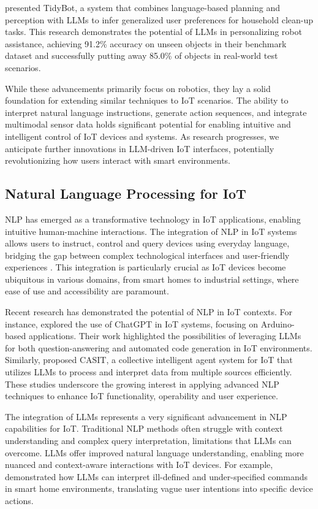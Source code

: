 \documentclass[lettersize,journal]{IEEEtran}
\begin{document}
\citet{Wu2023} presented TidyBot, a system that combines language-based planning and perception with LLMs to infer generalized user preferences for household clean-up tasks. This research demonstrates the potential of LLMs in personalizing robot assistance, achieving 91.2\% accuracy on unseen objects in their benchmark dataset and successfully putting away 85.0\% of objects in real-world test scenarios.

While these advancements primarily focus on robotics, they lay a solid foundation for extending similar techniques to IoT scenarios. The ability to interpret natural language instructions, generate action sequences, and integrate multimodal sensor data holds significant potential for enabling intuitive and intelligent control of IoT devices and systems. As research progresses, we anticipate further innovations in LLM-driven IoT interfaces, potentially revolutionizing how users interact with smart environments.

\subsection{Natural Language Processing for IoT}
NLP has emerged as a transformative technology in IoT applications, enabling intuitive human-machine interactions. The integration of NLP in IoT systems allows users to instruct, control and query devices using everyday language, bridging the gap between complex technological interfaces and user-friendly experiences \cite{10.1145/3643505}. This integration is particularly crucial as IoT devices become ubiquitous in various domains, from smart homes to industrial settings, where ease of use and accessibility are paramount.

Recent research has demonstrated the potential of NLP in IoT contexts. For instance, \citet{10315791} explored the use of ChatGPT in IoT systems, focusing on Arduino-based applications. Their work highlighted the possibilities of leveraging LLMs for both question-answering and automated code generation in IoT environments. Similarly, \citet{10439991} proposed CASIT, a collective intelligent agent system for IoT that utilizes LLMs to process and interpret data from multiple sources efficiently. These studies underscore the growing interest in applying advanced NLP techniques to enhance IoT functionality, operability and user experience.

The integration of LLMs represents a very significant advancement in NLP capabilities for IoT. Traditional NLP methods often struggle with context understanding and complex query interpretation, limitations that LLMs can overcome. LLMs offer improved natural language understanding, enabling more nuanced and context-aware interactions with IoT devices. For example, \citet{10.1145/3643505} demonstrated how LLMs can interpret ill-defined and under-specified commands in smart home environments, translating vague user intentions into specific device actions.
\end{document}
